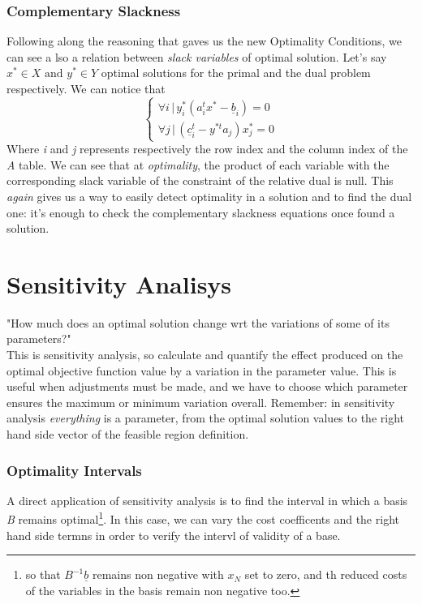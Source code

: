         \subsubsection{Complementary Slackness}
        Following along the reasoning that gaves us the new Optimality Conditions, we can see a lso a relation between \textit{slack variables} of optimal solution. Let's say $x^* \in X \text{ and } y^* \in Y$ optimal solutions for the primal and the dual problem respectively. We can notice that
        \begin{equation}
            \begin{cases}
                \forall i \,\vert\, y_i^*(a_i^tx^*-\underline{b}_i) = 0 \\
                \forall j \,\vert\, (\underline{c}_i^t - y^{*t}a_j)x_j^* = 0
            \end{cases}
        \end{equation}
        Where \emph{i} and \emph{j} represents respectively the row index and the column index of the \emph{A} table. We can see that at \textit{optimality}, the product of each variable with the corresponding slack variable of the constraint of the relative dual is null. This \textit{again} gives us a way to easily detect optimality in a solution and to find the dual one: it's enough to check the complementary slackness equations once found a solution.

    \section{Sensitivity Analisys}
			"How much does an optimal solution change wrt the variations of some of its parameters?"\\
			This is sensitivity analysis, so calculate and quantify the effect produced on the optimal objective function value by a variation in the parameter value. This is useful when adjustments must be made, and we have to choose which parameter ensures the maximum or minimum variation overall. Remember: in sensitivity analysis \textit{everything} is a parameter, from the optimal solution values to the right hand side vector of the feasible region definition.

			\subsubsection{Optimality Intervals}
				A direct application of sensitivity analysis is to find the interval in which a basis \emph{B} remains optimal\footnote{so that $B^{-1}\underline{b}$ remains non negative with $x_N$ set to zero, and th reduced costs of the variables in the basis remain non negative too.}. In this case, we can vary the cost coefficents and the right hand side termns in order to verify the intervl of validity of a base.

